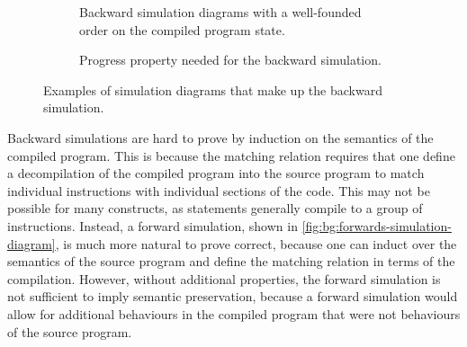 \begin{figure}
  \centering
  \begin{subfigure}[t]{0.6\linewidth}
    \centering
  \caption{Backward simulation diagrams with a well-founded order on the
    compiled program state.}%
  \label{fig:bg:backwards-simulation-diagram}
  \end{subfigure}\hfill%
  \begin{subfigure}[t]{0.35\linewidth}
    \centering
    \caption{Progress property needed for the backward simulation.}%
    \label{fig:bg:backwards-progress-property}
  \end{subfigure}
  \caption{Examples of simulation diagrams that make up the backward
    simulation.}%
  \label{fig:bg:backwards-simulation}
\end{figure}

Backward simulations are hard to prove by induction on the semantics of the
compiled program.  This is because the matching relation requires that one
define a decompilation of the compiled program into the source program to match
individual instructions with individual sections of the code.  This may not be
possible for many constructs, as statements generally compile to a group of
instructions.  Instead, a forward simulation, shown in
\cref{fig:bg:forwards-simulation-diagram}, is much more natural to prove
correct, because one can induct over the semantics of the source program and
define the matching relation in terms of the compilation.  However, without
additional properties, the forward simulation is not sufficient to imply
semantic preservation, because a forward simulation would allow for additional
behaviours in the compiled program that were not behaviours of the source
program.

